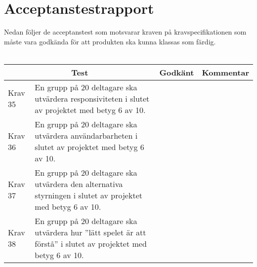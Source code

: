 \documentclass[10pt]{article}
\begin{document}
\section{Acceptanstestrapport}
Nedan följer de acceptanstest som motsvarar kraven på kravspecifikationen \cite{bib-kravspecifikation} som måste vara godkända för att produkten ska kunna klassas som färdig.
\\ \\
\noindent
	\begin{tabular}{| p{1.5cm} | p{5cm} | p{1.2cm}| p{7cm}|}
	
  \hline
    \multicolumn{2}{|c|}{Test}&{Godkänt}&{Kommentar}\\
    \hline


		Krav 35& En grupp på 20 deltagare ska utvärdera responsiviteten i slutet av projektet med betyg 6 av 10.&& \\
		\hline
		Krav 36& En grupp på 20 deltagare ska utvärdera användarbarheten i slutet av projektet med betyg 6 av 10.&& \\
		\hline
		Krav 37& En grupp på 20 deltagare ska utvärdera den alternativa styrningen i slutet av projektet med betyg 6 av 10.&& \\
		\hline
		Krav 38& En grupp på 20 deltagare ska utvärdera hur ''lätt spelet är att förstå'' i slutet av projektet med betyg 6 av 10.&& \\
		\hline

   
  \end{tabular}
  

\printbibliography	
	
\end{document}
